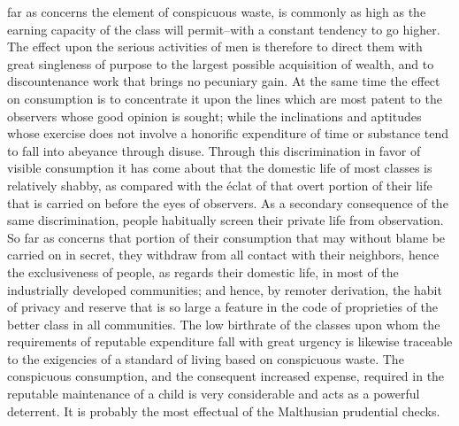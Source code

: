 \documentclass[12pt]{report}
\begin{document}
far as concerns the element of conspicuous waste, is commonly as high as
the earning capacity of the class will permit--with a constant tendency
to go higher. The effect upon the serious activities of men is therefore
to direct them with great singleness of purpose to the largest possible
acquisition of wealth, and to discountenance work that brings no
pecuniary gain. At the same time the effect on consumption is to
concentrate it upon the lines which are most patent to the observers
whose good opinion is sought; while the inclinations and aptitudes whose
exercise does not involve a honorific expenditure of time or substance
tend to fall into abeyance through disuse.
\clearpage
Through this discrimination in favor of visible consumption it has come
about that the domestic life of most classes is relatively shabby, as
compared with the éclat of that overt portion of their life that is
carried on before the eyes of observers. As a secondary consequence of
the same discrimination, people habitually screen their private life
from observation. So far as concerns that portion of their consumption
that may without blame be carried on in secret, they withdraw from all
contact with their neighbors, hence the exclusiveness of people, as
regards their domestic life, in most of the industrially developed
communities; and hence, by remoter derivation, the habit of privacy and
reserve that is so large a feature in the code of proprieties of the
better class in all communities. The low birthrate of the classes upon
whom the requirements of reputable expenditure fall with great urgency
is likewise traceable to the exigencies of a standard of living based
on conspicuous waste. The conspicuous consumption, and the consequent
increased expense, required in the reputable maintenance of a child is
very considerable and acts as a powerful deterrent. It is probably the
most effectual of the Malthusian prudential checks.
\end{document}
